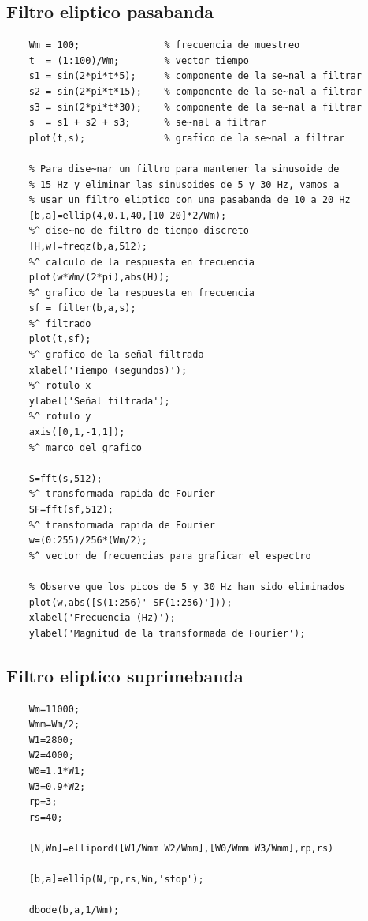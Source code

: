\subsection{Filtro eliptico pasabanda}

\begin{verbatim}
	Wm = 100;               % frecuencia de muestreo
	t  = (1:100)/Wm;        % vector tiempo    
	s1 = sin(2*pi*t*5);     % componente de la se~nal a filtrar
	s2 = sin(2*pi*t*15);    % componente de la se~nal a filtrar
	s3 = sin(2*pi*t*30);    % componente de la se~nal a filtrar
	s  = s1 + s2 + s3;      % se~nal a filtrar
	plot(t,s);              % grafico de la se~nal a filtrar
	
	% Para dise~nar un filtro para mantener la sinusoide de 
	% 15 Hz y eliminar las sinusoides de 5 y 30 Hz, vamos a 
	% usar un filtro eliptico con una pasabanda de 10 a 20 Hz
	[b,a]=ellip(4,0.1,40,[10 20]*2/Wm); 
	%^ dise~no de filtro de tiempo discreto
	[H,w]=freqz(b,a,512);               
	%^ calculo de la respuesta en frecuencia
	plot(w*Wm/(2*pi),abs(H));           
	%^ grafico de la respuesta en frecuencia
	sf = filter(b,a,s);                 
	%^ filtrado
	plot(t,sf);                         
	%^ grafico de la señal filtrada
	xlabel('Tiempo (segundos)');        
	%^ rotulo x
	ylabel('Señal filtrada');           
	%^ rotulo y
	axis([0,1,-1,1]);                   
	%^ marco del grafico
	
	S=fft(s,512);                       
	%^ transformada rapida de Fourier
	SF=fft(sf,512);                     
	%^ transformada rapida de Fourier
	w=(0:255)/256*(Wm/2);               
	%^ vector de frecuencias para graficar el espectro
	
	% Observe que los picos de 5 y 30 Hz han sido eliminados
	plot(w,abs([S(1:256)' SF(1:256)']));
	xlabel('Frecuencia (Hz)');
	ylabel('Magnitud de la transformada de Fourier'); 
\end{verbatim}

\subsection{Filtro eliptico suprimebanda}

\begin{verbatim}
	Wm=11000;
	Wmm=Wm/2;
	W1=2800;
	W2=4000;
	W0=1.1*W1;
	W3=0.9*W2;
	rp=3;
	rs=40;
	
	[N,Wn]=ellipord([W1/Wmm W2/Wmm],[W0/Wmm W3/Wmm],rp,rs)
	
	[b,a]=ellip(N,rp,rs,Wn,'stop');
	
	dbode(b,a,1/Wm);
	
\end{verbatim}

